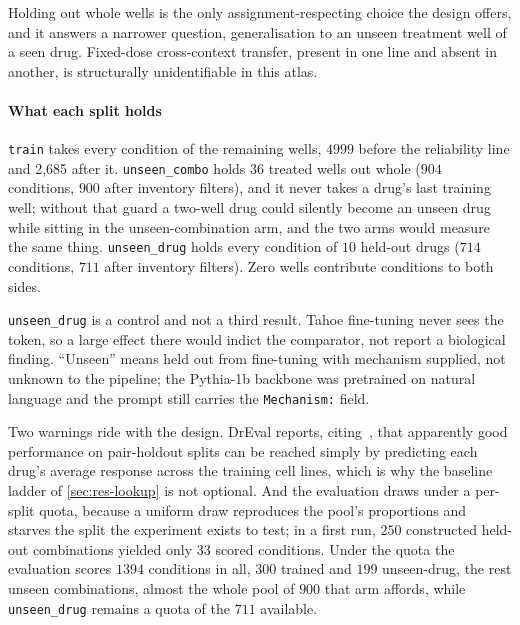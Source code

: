 Holding out whole wells is the only assignment-respecting choice the design
offers, and it answers a narrower question, generalisation to an unseen treatment
well of a seen drug. Fixed-dose cross-context transfer, present in one line and
absent in another, is structurally unidentifiable in this atlas.

\paragraph{What each split holds} \texttt{train} takes every condition of the
remaining wells, $\num{4999}$ before the reliability line and 2,685
after it.
\texttt{unseen\_combo} holds $\num{36}$ treated wells out whole ($\num{904}$
conditions, $\num{900}$ after inventory filters), and it never takes a drug's
last training well; without that guard a two-well drug could silently become an
unseen drug while sitting in the unseen-combination arm, and the two arms would
measure the same thing. \texttt{unseen\_drug} holds every condition of
$\num{10}$ held-out drugs ($\num{714}$ conditions, $\num{711}$ after inventory
filters). Zero wells contribute conditions to both sides.

\texttt{unseen\_drug} is a control and not a third result. Tahoe fine-tuning
never sees the token, so a large effect there would indict the comparator, not
report a biological finding. ``Unseen'' means held out from fine-tuning with
mechanism supplied, not unknown to the pipeline; the Pythia-1b backbone was
pretrained on natural language and the prompt still carries the
\texttt{Mechanism:} field.

Two warnings ride with the design. DrEval reports, citing~\cite{partin}, that
apparently good performance on pair-holdout splits can be reached simply by
predicting each drug's average response across the training cell lines, which is
why the baseline ladder of \cref{sec:res-lookup} is not optional. And the
evaluation draws under a per-split quota, because a uniform draw reproduces the
pool's proportions and starves the split the experiment exists to test; in a
first run,
$\num{250}$ constructed held-out combinations yielded only $\num{33}$ scored
conditions. Under the quota the evaluation scores $\num{1394}$ conditions in all,
$\num{300}$ trained and $\num{199}$ unseen-drug, the rest unseen combinations,
almost the whole pool of $\num{900}$ that arm affords, while
\texttt{unseen\_drug} remains a quota of the $\num{711}$ available.

